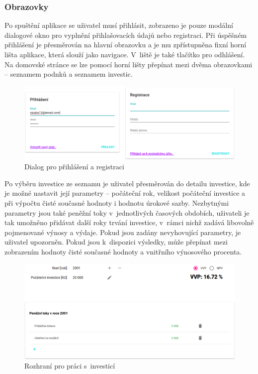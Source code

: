 \subsubsection{Obrazovky}

Po spuštění aplikace se uživatel musí přihlásit, zobrazeno je pouze modální dialogové okno pro vyplnění přihlašovacích údajů nebo registraci. Při úspěšném přihlášení je přesměrován na hlavní obrazovku a je mu zpřístupněna fixní horní lišta aplikace, která slouží jako navigace. V~liště je také tlačítko pro odhlášení. Na domovské stránce se lze pomocí horní lišty přepínat mezi dvěma obrazovkami -- seznamem podnků a seznamem investic.

\begin{figure}[!htb]
  \centering
  \includegraphics[width=14cm]{img/scr_log_reg.png}
  \caption{Dialog pro přihlášení a registraci}
\end{figure}

Po výběru investice ze seznamu je uživatel přesměrován do detailu investice, kde je možné nastavit její parametry -- počáteční rok, velikost počáteční investice a při výpočtu čisté současné hodnoty i hodnotu úrokové sazby. Nezbytnými parametry jsou také peněžní toky v~jednotlivých časových obdobích, uživateli je tak umožněno přidávat další roky trvání investice, v~rámci nichž zadává libovolně pojmenované výnosy a výdaje. Pokud jsou zadány nevyhovující parametry, je uživatel upozorněn. Pokud jsou k~dispozici výsledky, může přepínat mezi zobrazením hodnoty čisté současné hodnoty a vnitřního výnosového procenta.

\begin{figure}[!htb]
  \centering
  \includegraphics[width=14cm]{img/scr_inv.png}
  \caption{Rozhraní pro práci s~investicí}
\end{figure}

